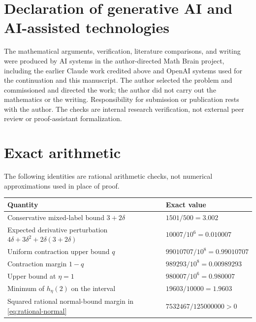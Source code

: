 \documentclass[11pt,a4paper]{article}
\numberwithin{equation}{section}
\theoremstyle{remark}
\begin{document}
\section*{Declaration of generative AI and AI-assisted technologies}
The mathematical arguments, verification, literature comparisons, and
writing were produced by AI systems in the author-directed Math Brain
project, including the earlier Claude work credited above and OpenAI
systems used for the continuation and this manuscript. The author
selected the problem and commissioned and directed the work; the author
did not carry out the mathematics or the writing. Responsibility for
submission or publication rests with the author. The checks are internal
research verification, not external peer review or proof-assistant
formalization.

\appendix
\section{Exact arithmetic}\label{app:provenance}

The following identities are rational arithmetic checks, not numerical
approximations used in place of proof.
\begin{center}
\small
\begin{tabularx}{\textwidth}{@{}X>{\raggedleft\arraybackslash}p{}@{}}
\toprule
Quantity & Exact value \\
\midrule
Conservative mixed-label bound $3+2\delta$ & $1501/500=3.002$ \\
Expected derivative perturbation $4\delta+3\delta^2+2\delta(3+2\delta)$
 & $10007/10^6=0.010007$ \\
Uniform contraction upper bound $q$ & $99010707/10^8=0.99010707$ \\
Contraction margin $1-q$ & $989293/10^8=0.00989293$ \\
Upper bound at $\eta=1$ & $980007/10^6=0.980007$ \\
Minimum of $h_\eta(2)$ on the interval & $19603/10000=1.9603$ \\
Squared rational normal-bound margin in \eqref{eq:rational-normal}
 & $7532467/125000000>0$ \\
\bottomrule
\end{tabularx}
\end{center}
\end{document}
